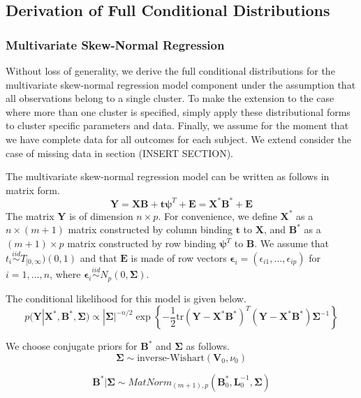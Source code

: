 \documentclass[useAMS,referee]{biom}
\newcommand{\tr}{\mbox{tr}}
\begin{document}
\newpage
\subsection{Derivation of Full Conditional Distributions}

\subsubsection{Multivariate Skew-Normal Regression}

Without loss of generality, we derive the full conditional distributions for the multivariate skew-normal regression model component under the assumption that all observations belong to a single cluster. To make the extension to the case where more than one cluster is specified, simply apply these distributional forms to cluster specific parameters and data. Finally, we assume for the moment that we have complete data for all outcomes for each subject. We extend consider the case of missing data in section (INSERT SECTION).

The multivariate skew-normal regression model can be written as follows in matrix form. 
$$\mathbf{Y} = \mathbf{X}\mathbf{B} + \mathbf{t} \boldsymbol\psi^T + \mathbf{E} = \mathbf{X}^* \mathbf{B}^* + \mathbf{E}$$
The matrix $\mathbf{Y}$ is of dimension $n \times p$. For convenience, we define $\mathbf{X}^*$ as a $n \times (m + 1)$ matrix constructed by column binding $\mathbf{t}$ to $\mathbf{X}$, and $\mathbf{B}^*$ as a $(m+1) \times p$ matrix constructed by row binding $\boldsymbol\psi^T$ to $\mathbf{B}$. We assume that $t_i \stackrel{iid}{\sim}T_{[0,\infty})(0,1)$ and that $\mathbf{E}$ is made of row vectors $\boldsymbol\epsilon_i = (\epsilon_{i1},...,\epsilon_{ip})$ for $i = 1,...,n$, where $ \boldsymbol\epsilon_i \stackrel{iid}{\sim} N_p(0, \boldsymbol\Sigma)$.

The conditional likelihood for this model is given below. 
$$p(\mathbf{Y}|\mathbf{X}^*,\mathbf{B}^*,\boldsymbol\Sigma) \propto |\boldsymbol\Sigma|^{-n/2}\exp \left \{ -\frac{1}{2} \tr(\mathbf{Y} - \mathbf{X}^* \mathbf{B}^*)^T(\mathbf{Y} - \mathbf{X}^* \mathbf{B}^*)\boldsymbol\Sigma^{-1} \right \}$$

We choose conjugate priors for $\mathbf{B}^*$ and $\boldsymbol\Sigma$ as follows. 
$$\boldsymbol\Sigma \sim \text{inverse-Wishart}(\mathbf{V}_0,\nu_0)$$

$$\mathbf{B}^*|\boldsymbol\Sigma \sim MatNorm_{(m+1), p}(\mathbf{B}_0^*,\mathbf{L}_0^{-1},\boldsymbol\Sigma)$$
\end{document}
